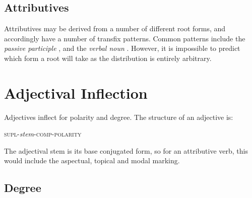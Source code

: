 \documentclass[grammar]{subfiles}
\begin{document}
  \subsection{Attributives}
  \label{ssec:am_attributives}

  Attributives may be derived from a number of different root forms, and accordingly have a number of transfix patterns. 
  Common patterns include the \emph{passive participle} , and the \emph{verbal noun} . 
  However, it is impossible to predict which form a root will take as the distribution is entirely arbitrary.

%
%


  \section{Adjectival Inflection}
  \label{sec:am_adjectival_inflection}

  Adjectives inflect for polarity and degree. The structure of an adjective is:

  \begin{exe}
    \ex\label{ex:am_adjective_structure} \textsc{supl-}\textit{stem}\textsc{-comp-polarity}
  \end{exe}	

  The adjectival stem is its base conjugated form, so for an attributive verb, this would include the aspectual, topical and modal marking. 

  \subsection{Degree}
  \label{ssec:am_degree}
\end{document}
